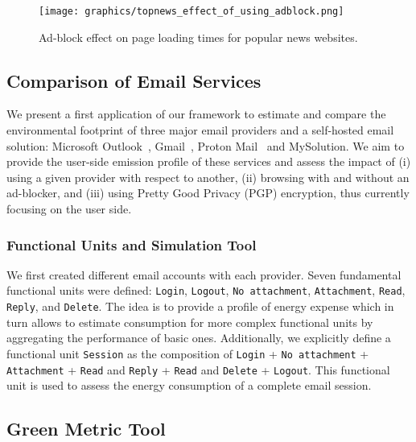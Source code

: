 \documentclass[sigconf,9pt,usenames,dvipsnames,table]{acmart}
\begin{document}
\begin{figure*}[htbp]
  \centering
  \texttt{[image: graphics/topnews\_effect\_of\_using\_adblock.png]}
  \caption{Ad-block effect on page loading times for popular news websites.}
  \label{fig:topnews_effect_of_using_adblock}
\end{figure*}

\subsection{Comparison of Email Services}

We present a first application of our framework to estimate and
compare the environmental footprint of three major email providers and a self-hosted email solution:
Microsoft Outlook~\cite{outlook}, Gmail~\cite{gmail}, Proton Mail~\cite{proton} and MySolution. We aim to provide the user-side emission profile of these services and assess the impact of (i) using a given provider with respect to another, (ii) browsing with and without an ad-blocker, and (iii) using Pretty Good Privacy (PGP) encryption, thus currently focusing on the user side.

\subsubsection{Functional Units and Simulation Tool}

We first created different email accounts with each provider. Seven fundamental functional units were defined: \texttt{Login}, \texttt{Logout}, \texttt{No attachment}, \texttt{Attachment}, \texttt{Read}, \texttt{Reply}, and \texttt{Delete}. The idea is to provide a profile of energy expense which in turn allows to estimate consumption for more complex functional units by aggregating the performance of basic ones. Additionally, we explicitly define a functional unit \texttt{Session} as the composition of \texttt{Login} + \texttt{No attachment} + \texttt{Attachment} + \texttt{Read} and \texttt{Reply} + \texttt{Read} and \texttt{Delete} + \texttt{Logout}. This functional unit is used to assess the energy consumption of a complete email session.

\subsection{Green Metric Tool}
\end{document}
